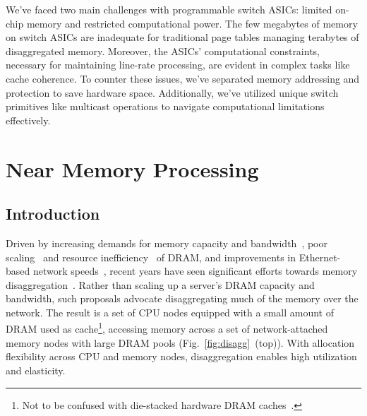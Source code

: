 We've faced two main challenges with programmable switch ASICs: limited on-chip memory and restricted computational power. The few megabytes of memory on switch ASICs are inadequate for traditional page tables managing terabytes of disaggregated memory. Moreover, the ASICs' computational constraints, necessary for maintaining line-rate processing, are evident in complex tasks like cache coherence. To counter these issues, we've separated memory addressing and protection to save hardware space. Additionally, we've utilized unique switch primitives like multicast operations to navigate computational limitations effectively.





\section{Near Memory Processing}

\subsection{Introduction}



\noindent
Driven by increasing demands for memory capacity and bandwidth~\cite{scuba, cachelib, tao, memcache, flighttracker, twittercache, spark}, poor scaling~\cite{memscaling2, memscaling3, memscaling1} and resource inefficiency~\cite{infiniswap, memoverprovisioning} of DRAM, and improvements in Ethernet-based network speeds~\cite{terabitethernet, remotememory}, recent years have seen significant efforts towards memory disaggregation~\cite{fastswap, memdisagg1, infiniswap, mind, legoos}. Rather than scaling up a server's DRAM capacity and bandwidth, such proposals advocate disaggregating much of the memory over the network. The result is a set of CPU nodes equipped with a small amount of DRAM used as cache\footnote{Not to be confused with die-stacked hardware DRAM caches~\cite{jevdjic2013stacked, jevdjic2014unison, young2018accord}.}, accessing memory across a set of network-attached memory nodes with large DRAM pools (Fig.~\ref{fig:disagg}~(top)). With allocation flexibility across CPU and memory nodes, disaggregation enables high utilization and elasticity.


